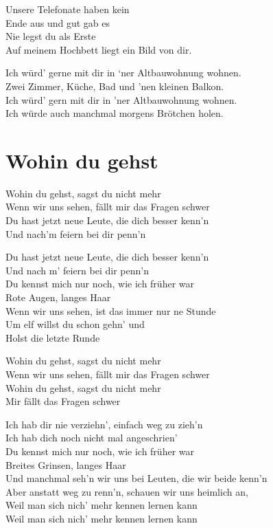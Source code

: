 \documentclass[]{book}
\begin{document}
Unsere Telefonate haben kein\\
Ende aus und gut gab es\\
Nie legst du als Erste\\
Auf meinem Hochbett liegt ein Bild von dir.

Ich würd' gerne mit dir in `ner Altbauwohnung wohnen.\\
Zwei Zimmer, Küche, Bad und 'nen kleinen Balkon.\\
Ich würd' gern mit dir in 'ner Altbauwohnung wohnen.\\
Ich würde auch manchmal morgens Brötchen holen.

\hypertarget{wohin-du-gehst}{%
\section{Wohin du gehst}\label{wohin-du-gehst}}

Wohin du gehst, sagst du nicht mehr\\
Wenn wir uns sehen, fällt mir das Fragen schwer\\
Du hast jetzt neue Leute, die dich besser kenn'n\\
Und nach'm feiern bei dir penn'n

Du hast jetzt neue Leute, die dich besser kenn'n\\
Und nach m' feiern bei dir penn'n\\
Du kennst mich nur noch, wie ich früher war\\
Rote Augen, langes Haar\\
Wenn wir uns sehen, ist das immer nur ne Stunde\\
Um elf willst du schon gehn' und\\
Holst die letzte Runde

Wohin du gehst, sagst du nicht mehr\\
Wenn wir uns sehen, fällt mir das Fragen schwer\\
Wohin du gehst, sagst du nicht mehr\\
Mir fällt das Fragen schwer

Ich hab dir nie verziehn', einfach weg zu zieh'n\\
Ich hab dich noch nicht mal angeschrien'\\
Du kennst mich nur noch, wie ich früher war\\
Breites Grinsen, langes Haar\\
Und manchmal seh'n wir uns bei Leuten, die wir beide kenn'n\\
Aber anstatt weg zu renn'n, schauen wir uns heimlich an,\\
Weil man sich nich' mehr kennen lernen kann\\
Weil man sich nich' mehr kennen lernen kann
\end{document}
